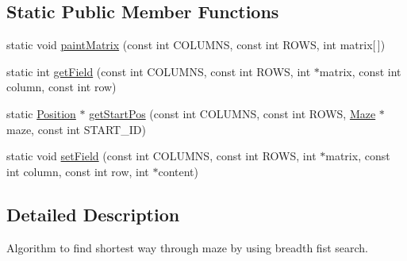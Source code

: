 \subsection*{Static Public Member Functions}
\begin{DoxyCompactItemize}
\item 
static void \hyperlink{class_breadth_first_search_aa17fd4a24cc6c9765b64ba2e536d84c8}{paint\-Matrix} (const int C\-O\-L\-U\-M\-N\-S, const int R\-O\-W\-S, int matrix\mbox{[}$\,$\mbox{]})
\item 
static int \hyperlink{class_breadth_first_search_a1e5271b5561e4fe52b7e67917f72511e}{get\-Field} (const int C\-O\-L\-U\-M\-N\-S, const int R\-O\-W\-S, int $\ast$matrix, const int column, const int row)
\item 
static \hyperlink{class_position}{Position} $\ast$ \hyperlink{class_breadth_first_search_a533670621ed3c1e3bfba89d667dab4c3}{get\-Start\-Pos} (const int C\-O\-L\-U\-M\-N\-S, const int R\-O\-W\-S, \hyperlink{class_maze}{Maze} $\ast$maze, const int S\-T\-A\-R\-T\-\_\-\-I\-D)
\item 
static void \hyperlink{class_breadth_first_search_a29e052c3dd62782fabc59a68ef27cade}{set\-Field} (const int C\-O\-L\-U\-M\-N\-S, const int R\-O\-W\-S, int $\ast$matrix, const int column, const int row, int $\ast$content)
\end{DoxyCompactItemize}


\subsection{Detailed Description}
Algorithm to find shortest way through maze by using breadth fist search. 

